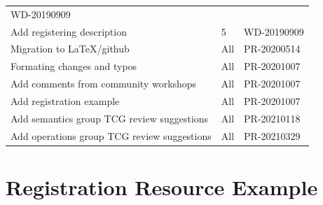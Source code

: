 \documentclass[11pt,a4paper]{ivoa}
\begin{document}
\begin{table}[H]
\begin{tabular}{p{3.75in}p{0.92in}p{0.8in}}
\multicolumn{1}{|p{0.9in}|}{{\fontsize{10pt}{12.0pt}\selectfont WD-20190909}} \\
\multicolumn{1}{|p{3.75in}}{Add registering description} &
\multicolumn{1}{|p{0.72in}}{5} &
\multicolumn{1}{|p{0.9in}|}{{\fontsize{10pt}{12.0pt}\selectfont WD-20190909}} \\
\multicolumn{1}{|p{3.75in}}{Migration to LaTeX/github} &
\multicolumn{1}{|p{0.72in}}{All} &
\multicolumn{1}{|p{0.9in}|}{{\fontsize{10pt}{12.0pt}\selectfont PR-20200514}} \\
\multicolumn{1}{|p{3.75in}}{Formating changes and typos} &
\multicolumn{1}{|p{0.72in}}{All} &
\multicolumn{1}{|p{0.9in}|}{{\fontsize{10pt}{12.0pt}\selectfont PR-20201007}} \\
\multicolumn{1}{|p{3.75in}}{Add comments from community workshops} &
\multicolumn{1}{|p{0.72in}}{All} &
\multicolumn{1}{|p{0.9in}|}{{\fontsize{10pt}{12.0pt}\selectfont PR-20201007}} \\
\multicolumn{1}{|p{3.75in}}{Add registration example} &
\multicolumn{1}{|p{0.72in}}{All} &
\multicolumn{1}{|p{0.9in}|}{{\fontsize{10pt}{12.0pt}\selectfont PR-20201007}} \\
\multicolumn{1}{|p{3.75in}}{Add semantics group TCG review suggestions} &
\multicolumn{1}{|p{0.72in}}{All} &
\multicolumn{1}{|p{0.9in}|}{{\fontsize{10pt}{12.0pt}\selectfont PR-20210118}} \\
\multicolumn{1}{|p{3.75in}}{Add operations group TCG review suggestions} &
\multicolumn{1}{|p{0.72in}}{All} &
\multicolumn{1}{|p{0.9in}|}{{\fontsize{10pt}{12.0pt}\selectfont PR-20210329}} \\

\hline
\end{tabular}
 \end{table}

\pagebreak


\section{Registration Resource Example}



\end{document}
